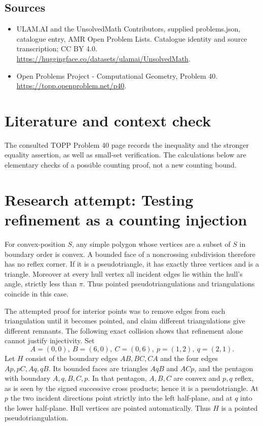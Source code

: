 \documentclass[11pt,a4paper]{article}
\begin{document}
\subsection{Sources}
\begin{itemize}
\item[S1] ULAM.AI and the UnsolvedMath Contributors, supplied problems.json, catalogue entry, AMR Open Problem Lists. Catalogue identity and source transcription; CC BY 4.0.
\url{https://huggingface.co/datasets/ulamai/UnsolvedMath}.
\item[S2] Open Problems Project - Computational Geometry, Problem 40. 
\url{https://topp.openproblem.net/p40}.
\end{itemize}

\section{Literature and context check}
The consulted TOPP Problem 40 page records the inequality and the stronger
equality assertion, as well as small-set verification. The calculations below
are elementary checks of a possible counting proof, not a new counting bound.
\section{Research attempt: Testing refinement as a counting injection}
For convex-position $S$, any simple polygon whose vertices are a subset of
$S$ in boundary order is convex. A bounded face of a noncrossing subdivision
therefore has no reflex corner. If it is a pseudotriangle, it has exactly three
vertices and is a triangle. Moreover at every hull vertex all incident edges lie
within the hull's angle, strictly less than $\pi$. Thus pointed
pseudotriangulations and triangulations coincide in this case.

The attempted proof for interior points was to remove edges from each
triangulation until it becomes pointed, and claim different triangulations give
different remnants. The following exact collision shows that refinement alone
cannot justify injectivity. Set
\[
 A=(0,0),\ B=(6,0),\ C=(0,6),\ p=(1,2),\ q=(2,1).
\]
Let $H$ consist of the boundary edges $AB,BC,CA$ and the four edges
$Ap,pC,Aq,qB$. Its bounded faces are triangles $AqB$ and $ACp$, and the
pentagon with boundary $A,q,B,C,p$. In that pentagon, $A,B,C$ are convex
and $p,q$ reflex, as is seen by the signed successive cross products; hence
it is a pseudotriangle. At $p$ the two incident directions point strictly into
the left half-plane, and at $q$ into the lower half-plane. Hull vertices are
pointed automatically. Thus $H$ is a pointed pseudotriangulation.
\end{document}
